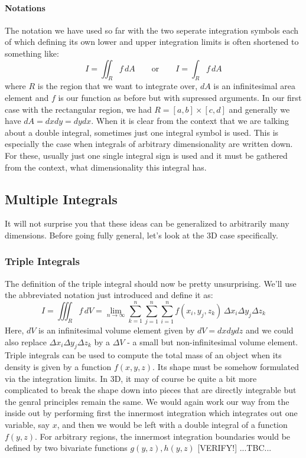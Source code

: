 \paragraph{Notations}
The notation we have used so far with the two seperate integration symbols each of which defining its own lower and upper integration limits is often shortened to something like:
\begin{equation}
I = \iint_R f \, dA  \qquad \text{or}  \qquad 
I = \int_R  f \, dA
\end{equation}
where $R$ is the region that we want to integrate over, $d A$ is an infinitesimal area element and $f$ is our function as before but with supressed arguments. In our first case with the rectangular region, we had $R = [a,b] \times [c,d]$ and generally we have $dA = dx dy = dy dx$. When it is clear from the context that we are talking about a double integral, sometimes just one integral symbol is used. This is especially the case when integrals of arbitrary dimensionality are written down. For these, usually just one single integral sign is used and it must be gathered from the context, what dimensionality this integral has.



\subsection{Multiple Integrals}
It will not surprise you that these ideas can be generalized to arbitrarily many dimensions. Before going fully general, let's look at the 3D case specifically.

\subsubsection{Triple Integrals}
The definition of the triple integral should now be pretty unsurprising. We'll use the abbreviated notation just introduced and define it as:
\begin{equation}
I = \iiint_R f \, dV = \lim_{n \rightarrow \infty} \sum_{k=1}^n \sum_{j=1}^n \sum_{i=1}^n f(x_i, y_j, z_k) \, \Delta x_i \Delta y_j \Delta z_k
\end{equation}
Here, $dV$ is an infinitesimal volume element given by $dV = dx dy dz$ and we could also replace $\Delta x_i \Delta y_j \Delta z_k$ by a $\Delta V$ - a small but non-infinitesimal volume element. Triple integrals can be used to compute the total mass of an object when its density is given by a function $f(x,y,z)$. Its shape must be somehow formulated via the integration limits. In 3D, it may of course be quite a bit more complicated to break the shape down into pieces that are directly integrable but the genral principles remain the same. We would again work our way from the inside out by performing first the innermost integration which integrates out one variable, say $x$, and then we would be left with a double integral of a function $f(y,z)$. For arbitrary regions, the innermost integration boundaries would be defined by two bivariate functions $g(y,z), h(y,z)$ [VERIFY!]
...TBC...

